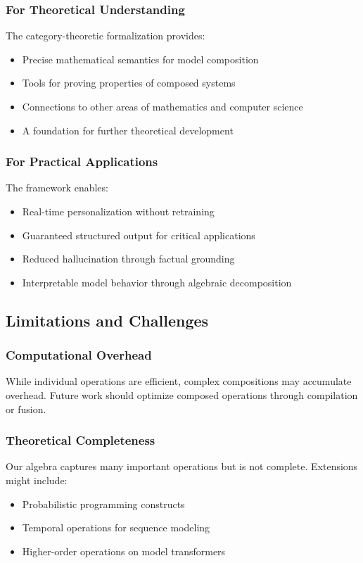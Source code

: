 \documentclass{article}
\theoremstyle{definition}
\begin{document}
\subsubsection{For Theoretical Understanding}
The category-theoretic formalization provides:
\begin{itemize}
    \item Precise mathematical semantics for model composition
    \item Tools for proving properties of composed systems
    \item Connections to other areas of mathematics and computer science
    \item A foundation for further theoretical development
\end{itemize}

\subsubsection{For Practical Applications}
The framework enables:
\begin{itemize}
    \item Real-time personalization without retraining
    \item Guaranteed structured output for critical applications
    \item Reduced hallucination through factual grounding
    \item Interpretable model behavior through algebraic decomposition
\end{itemize}

\subsection{Limitations and Challenges}

\subsubsection{Computational Overhead}
While individual operations are efficient, complex compositions may accumulate overhead. Future work should optimize composed operations through compilation or fusion.

\subsubsection{Theoretical Completeness}
Our algebra captures many important operations but is not complete. Extensions might include:
\begin{itemize}
    \item Probabilistic programming constructs
    \item Temporal operations for sequence modeling
    \item Higher-order operations on model transformers
\end{itemize}
\end{document}
